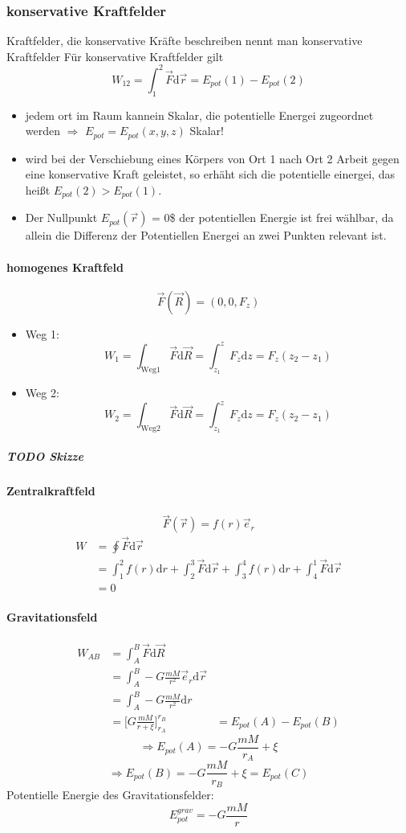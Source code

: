 \documentclass[a4paper]{scrartcl}
\renewcommand{\d}{\mathrm{d}}
\renewcommand{\v}[1]{\vec{#1}}
\theoremstyle{definition}
\theoremstyle{plain}
\theoremstyle{plain}
\theoremstyle{remark}
\theoremstyle{remark}
\theoremstyle{remark}
\begin{document}
\subsubsection{konservative Kraftfelder}
\label{sec-4-9-4}
Kraftfelder, die konservative Kräfte beschreiben nennt man konservative Kraftfelder
Für konservative Kraftfelder gilt
\[W_{12} = \int_1^2\v F\d\v r = E_{pot}(1) - E_{pot}(2)\]
\begin{itemize}
\item jedem ort im Raum kannein Skalar, die potentielle Energei zugeordnet werden $\Rightarrow$ $E_{pot} = E_{pot}(x,y,z)$ Skalar!
\item wird bei der Verschiebung eines Körpers von Ort 1 nach Ort 2 Arbeit gegen eine konservative Kraft geleistet, so erhäht sich die potentielle einergei, das heißt $E_{pot}(2) > E_{pot}(1)$.
\item Der Nullpunkt $E_{pot}(\v r)$ = 0\$ der potentiellen Energie ist frei wählbar, da allein die Differenz der Potentiellen Energei an zwei Punkten relevant ist.
\end{itemize}
\paragraph{homogenes Kraftfeld}
\label{sec-4-9-4-1}
\[\v F(\v R) = (0,0,F_z)\]
\begin{itemize}
\item Weg 1: \[W_1 = \int_{\text{Weg1}}\v F\d \v R = \int_{z_1}^z F_z\d z = F_z(z_2 - z_1)\]
\item Weg 2: \[W_2 = \int_{\text{Weg2}}\v F\d \v R = \int_{z_1}^z F_z\d z = F_z(z_2 - z_1)\]
\end{itemize}
\subparagraph{{\bfseries\sffamily TODO} Skizze}
\label{sec-4-9-4-1-1}
\paragraph{Zentralkraftfeld}
\label{sec-4-9-4-2}
\[\v F(\v r) = f(r)\v e_r\]
\begin{align}
W &= \oint\v F\d \v r \\
&= \int_1^2 f(r)\d r + \int_2^3 \v F\d \v r + \int_3^4 f(r)\d r + \int_4^1 \v F\d \v r \\
&= 0
\end{align}
\paragraph{Gravitationsfeld}
\label{sec-4-9-4-3}
\begin{align}
W_{AB} &= \int_A^B\v F\d \v R \\
&= \int_A^B -G\frac{mM}{r^2}\v e_r\d\v r \\
&= \int_A^B -G\frac{mM}{r^2}\d r \\
&= \Big[G\frac{mM}{r + \xi}\Big]_{r_A}^{r_B}
&= E_{pot}(A) - E_{pot}(B)
\end{align}
\[\Rightarrow E_{pot}(A) = -G\frac{mM}{r_A} + \xi\]
\[\Rightarrow E_{pot}(B) = -G\frac{mM}{r_B} + \xi = E_{pot}(C)\]
Potentielle Energie des Gravitationsfelder:
\[E_{pot}^{grav} = -G\frac{mM}{r}\]
\end{document}
